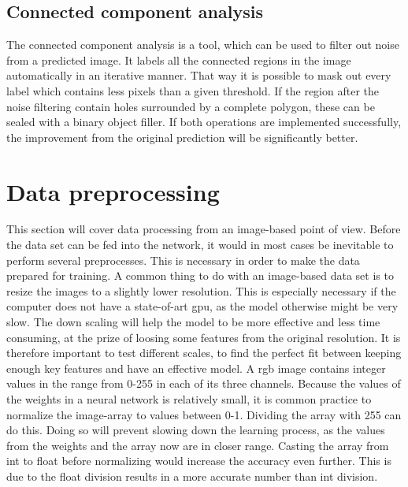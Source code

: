 \documentclass[USenglish]{ifimaster}  %
\begin{document}
\subsection{Connected component analysis}
The connected component analysis is a tool, which can be used to filter out noise from a predicted image. It labels all the connected regions in the image automatically in an iterative manner. That way it is possible to mask out every label which contains less pixels than a given threshold. If the region after the noise filtering contain holes surrounded by a complete polygon, these can be sealed with a binary object filler. If both operations are implemented successfully, the improvement from the original prediction will be significantly better.

\section{Data preprocessing}
This section will cover data processing from an image-based point of view. Before the data set can be fed into the network, it would in most cases be inevitable to perform several preprocesses. This is necessary in order to make the data prepared for training. 
\newline
A common thing to do with an image-based data set is to resize the images to a slightly lower resolution. This is especially necessary if the computer does not have a state-of-art \ac{gpu}, as the model otherwise might be very slow. The down scaling will help the model to be more effective and less time consuming, at the prize of loosing some features from the original resolution. It is therefore important to test different scales, to find the perfect fit between keeping enough key features and have an effective model.
\newline
A \ac{rgb} image contains integer values in the range from 0-255 in each of its three channels. Because the values of the weights in a neural network is relatively small, it is common practice to normalize the image-array to values between 0-1. Dividing the array with 255 can do this. Doing so will prevent slowing down the learning process, as the values from the weights and the array now are in closer range. Casting the array from int to float before normalizing would increase the accuracy even further. This is due to the float division results in a more accurate number than int division. 
\newline
\newline
\end{document}
